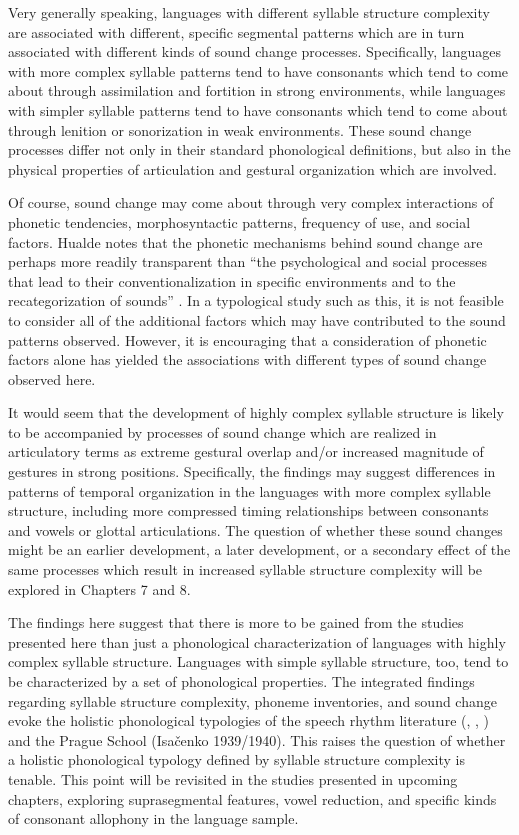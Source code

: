   Very generally speaking, languages with different syllable structure complexity are associated with different, specific segmental patterns which are in turn associated with different kinds of sound change processes. Specifically, languages with more complex syllable patterns tend to have consonants which tend to come about through assimilation and fortition in strong environments, while languages with simpler syllable patterns tend to have consonants which tend to come about through lenition or sonorization in weak environments. These sound change processes differ not only in their standard phonological definitions, but also in the physical properties of articulation and gestural organization which are involved.

  Of course, sound change may come about through very complex interactions of phonetic tendencies, morphosyntactic patterns, frequency of use, and social factors. Hualde notes that the phonetic mechanisms behind sound change are perhaps more readily transparent than “the psychological and social processes that lead to their conventionalization in specific environments and to the recategorization of sounds” \citep[2222]{Hualde2011}. In a typological study such as this, it is not feasible to consider all of the additional factors which may have contributed to the sound patterns observed. However, it is encouraging that a consideration of phonetic factors alone has yielded the associations with different types of sound change observed here.

  It would seem that the development of highly complex syllable structure is likely to be accompanied by processes of sound change which are realized in articulatory terms as extreme gestural overlap and/or increased magnitude of gestures in strong positions. Specifically, the findings may suggest differences in patterns of temporal organization in the languages with more complex syllable structure, including more compressed timing relationships between consonants and vowels or glottal articulations. The question of whether these sound changes might be an earlier development, a later development, or a secondary effect of the same processes which result in increased syllable structure complexity will be explored in Chapters 7 and 8.

  The findings here suggest that there is more to be gained from the studies presented here than just a phonological characterization of languages with highly complex syllable structure. Languages with simple syllable structure, too, tend to be characterized by a set of phonological properties. The integrated findings regarding syllable structure complexity, phoneme inventories, and sound change evoke the holistic phonological typologies of the speech rhythm literature (\citealt{Roach1982}, \citealt{Dauer1983}, \citealt{Auer1993}) and the Prague School (Isačenko 1939/1940). This raises the question of whether a holistic phonological typology defined by syllable structure complexity is tenable. This point will be revisited in the studies presented in upcoming chapters, exploring suprasegmental features, vowel reduction, and specific kinds of consonant allophony in the language sample.

